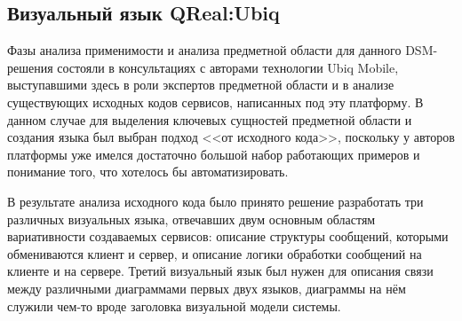 \subsection{Визуальный язык QReal:Ubiq}
Фазы анализа применимости и анализа предметной области для данного \ac{DSM}-решения состояли 
в консультациях с авторами технологии Ubiq Mobile, выступавшими здесь в роли экспертов 
предметной области и в анализе существующих исходных кодов сервисов, написанных под 
эту платформу. В данном случае для выделения ключевых сущностей предметной области и 
создания языка был выбран подход <<от исходного кода>>, поскольку у авторов платформы 
уже имелся достаточно большой набор работающих примеров и понимание того, что хотелось 
бы автоматизировать.

В результате анализа исходного кода было принято решение разработать три различных 
визуальных языка, отвечавших двум основным областям вариативности создаваемых сервисов: 
описание структуры сообщений, которыми обмениваются клиент и сервер, и описание логики 
обработки сообщений на клиенте и на сервере. Третий визуальный язык был нужен для 
описания связи между различными диаграммами первых двух языков, диаграммы на нём 
служили чем-то вроде заголовка визуальной модели системы. 

